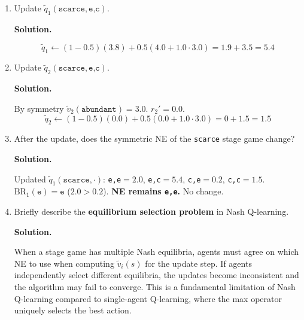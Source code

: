 \documentclass[12pt]{article}
\newenvironment{solution}{%
  \ifshowsolutions\begin{solutionbox}\noindent\textbf{\color{blue!70!black}Solution.}\quad\fi
  \ifshowsolutions\else\expandafter\comment\fi
}{%
  \ifshowsolutions\end{solutionbox}\fi
  \ifshowsolutions\else\expandafter\endcomment\fi
}
\begin{document}
\begin{enumerate}
\begin{enumerate}
\begin{solution}
    (Check \texttt{c,c}: $\mathrm{BR}_1(\texttt{c})=\texttt{e}$ ($4.1>4.0$). Not a NE.)
  \end{solution}

  \item Update $\tilde{q}_1(\texttt{scarce},\texttt{e,c})$.

  \begin{solution}
    \[\tilde{q}_1 \leftarrow (1-0.5)(3.8)+0.5(4.0+1.0\cdot3.0)=1.9+3.5=\mathbf{5.4}\]
  \end{solution}

  \item Update $\tilde{q}_2(\texttt{scarce},\texttt{e,c})$.

  \begin{solution}
    By symmetry $\tilde{v}_2(\texttt{abundant})=3.0$. $r_2'=0.0$.
    \[\tilde{q}_2 \leftarrow (1-0.5)(0.0)+0.5(0.0+1.0\cdot3.0)=0+1.5=\mathbf{1.5}\]
  \end{solution}

  \item After the update, does the symmetric NE of the \texttt{scarce} stage game change?

  \begin{solution}
    Updated $\tilde{q}_1(\texttt{scarce},\cdot)$: \texttt{e,e}$=2.0$, \texttt{e,c}$=5.4$, \texttt{c,e}$=0.2$, \texttt{c,c}$=1.5$.
    $\mathrm{BR}_1(\texttt{e})=\texttt{e}$ ($2.0>0.2$). \textbf{NE remains \texttt{e,e}.} No change.
  \end{solution}

  \item Briefly describe the \textbf{equilibrium selection problem} in Nash Q-learning.

  \begin{solution}
    When a stage game has multiple Nash equilibria, agents must agree on which NE to use when computing $\tilde{v}_i(s)$ for the update step. If agents independently select different equilibria, the updates become inconsistent and the algorithm may fail to converge. This is a fundamental limitation of Nash Q-learning compared to single-agent Q-learning, where the max operator uniquely selects the best action.
  \end{solution}
\end{enumerate}

\end{enumerate}
\end{document}
